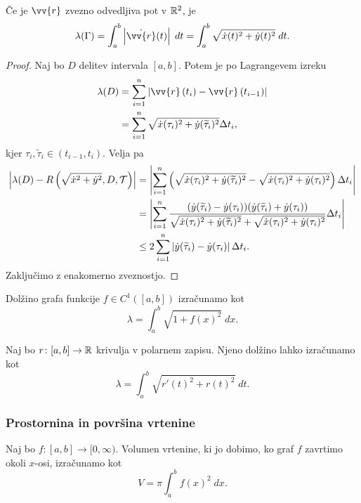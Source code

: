 \documentclass[12pt, a4paper]{article}
\begin{document}
\begin{izrek}
Če je $\vv{r}$ zvezno odvedljiva pot v $\mathbb{R}^2$, je
\[
\lambda(\Gamma)=\int_a^b \abs{\dot{\vv{r}}(t)}\;dt=\int_a^b\sqrt{\dot{x}(t)^2+\dot{y}(t)^2}\;dt.
\]
\end{izrek}

\begin{proof}
Naj bo $D$ delitev intervala $[a,b]$. Potem je po Lagrangevem izreku
\begin{align*}
\lambda(D)&=\sum_{i=1}^n\abs{\vv{r}\left(t_i\right)-\vv{r}\left(t_{i-1}\right)}
\\
&=\sum_{i=1}^n\sqrt{\dot{x}(\tau_i)^2+\dot{y}(\widetilde{\tau}_i)^2}\Delta t_i,
\end{align*}
kjer $\tau_i,\widetilde{\tau}_i\in(t_{i-1},t_i)$. Velja pa
\begin{align*}
\left\lvert \lambda(D)-R\left(\sqrt{\dot{x}^2+\dot{y}^2},D,\mathcal{T}\right)\right\rvert&=\left\lvert \sum_{i=1}^n\left(\sqrt{\dot{x}(\tau_i)^2+\dot{y}(\widetilde{\tau}_i)^2}-\sqrt{\dot{x}(\tau_i)^2+\dot{y}(\tau_i)^2}\right)\Delta t_i\right\rvert
\\
&=\left\lvert \sum_{i=1}^n\frac{(\dot{y}(\widetilde{\tau}_i)-\dot{y}(\tau_i))(\dot{y}(\widetilde{\tau}_i)+\dot{y}(\tau_i))}{\sqrt{\dot{x}(\tau_i)^2+\dot{y}(\widetilde{\tau}_i)^2}+\sqrt{\dot{x}(\tau_i)^2+\dot{y}(\tau_i)^2}}\Delta t_i\right\rvert
\\
&\leq 2\sum_{i=1}^n\left\lvert \dot{y}(\widetilde{\tau}_i)-\dot{y}(\tau_i)\right\rvert\Delta t_i.
\end{align*}
Zaključimo z enakomerno zveznostjo.
\end{proof}

\begin{posledica}
Dolžino grafa funkcije $f\in C^1([a,b])$ izračunamo kot
\[
\lambda=\int_a^b \sqrt{1+f(x)^2}\;dx.
\]
\end{posledica}

\begin{posledica}
Naj bo $r\colon[a,b]\to\mathbb{R}$ krivulja v polarnem zapisu. Njeno dolžino lahko izračunamo kot
\[
\lambda=\int_a^b\sqrt{r'(t)^2+r(t)^2}\;dt.
\]
\end{posledica}

\obvs

\subsubsection{Prostornina in površina vrtenine}

\begin{trditev}
Naj bo $f\colon[a,b]\to[0,\infty)$. Volumen vrtenine, ki jo dobimo, ko graf $f$ zavrtimo okoli $x$-osi, izračunamo kot
\[
V=\pi\int_a^b f(x)^2\;dx.
\]
\end{trditev}
\end{document}
